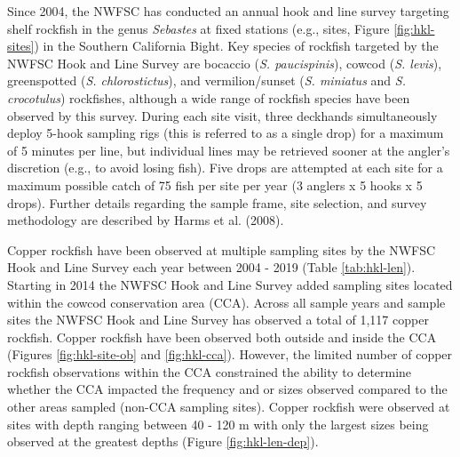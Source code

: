 \documentclass[11pt,
  english,
  a4paper,
]{article}
\begin{document}
\leavevmode\tagmcend\tagstructend


Since 2004, the NWFSC has conducted an annual hook and line survey targeting shelf rockfish in the genus \emph{Sebastes} at fixed stations (e.g., sites, Figure \ref{fig:hkl-sites}) in the Southern California Bight. Key species of rockfish targeted by the NWFSC Hook and Line Survey are bocaccio (\emph{S. paucispinis}), cowcod (\emph{S. levis}), greenspotted (\emph{S. chlorostictus}), and vermilion/sunset (\emph{S. miniatus} and \emph{S. crocotulus}) rockfishes, although a wide range of rockfish species have been observed by this survey. During each site visit, three deckhands simultaneously deploy 5-hook sampling rigs (this is referred to as a single drop) for a maximum of 5 minutes per line, but individual lines may be retrieved sooner at the angler's discretion (e.g., to avoid losing fish). Five drops are attempted at each site for a maximum possible catch of 75 fish per site per year (3 anglers x 5 hooks x 5 drops). Further details regarding the sample frame, site selection, and survey methodology are described by Harms et al. {(2008)\leavevmode\tagmcend\tagstructend}.

\leavevmode\tagmcend\tagstructend\par


Copper rockfish have been observed at multiple sampling sites by the NWFSC Hook and Line Survey each year between 2004 - 2019 (Table \ref{tab:hkl-len}). Starting in 2014 the NWFSC Hook and Line Survey added sampling sites located within the cowcod conservation area (CCA). Across all sample years and sample sites the NWFSC Hook and Line Survey has observed a total of 1,117 copper rockfish. Copper rockfish have been observed both outside and inside the CCA (Figures \ref{fig:hkl-site-ob} and \ref{fig:hkl-cca}). However, the limited number of copper rockfish observations within the CCA constrained the ability to determine whether the CCA impacted the frequency and or sizes observed compared to the other areas sampled (non-CCA sampling sites). Copper rockfish were observed at sites with depth ranging between 40 - 120 m with only the largest sizes being observed at the greatest depths (Figure \ref{fig:hkl-len-dep}).

\leavevmode\tagmcend\tagstructend\par
\end{document}
